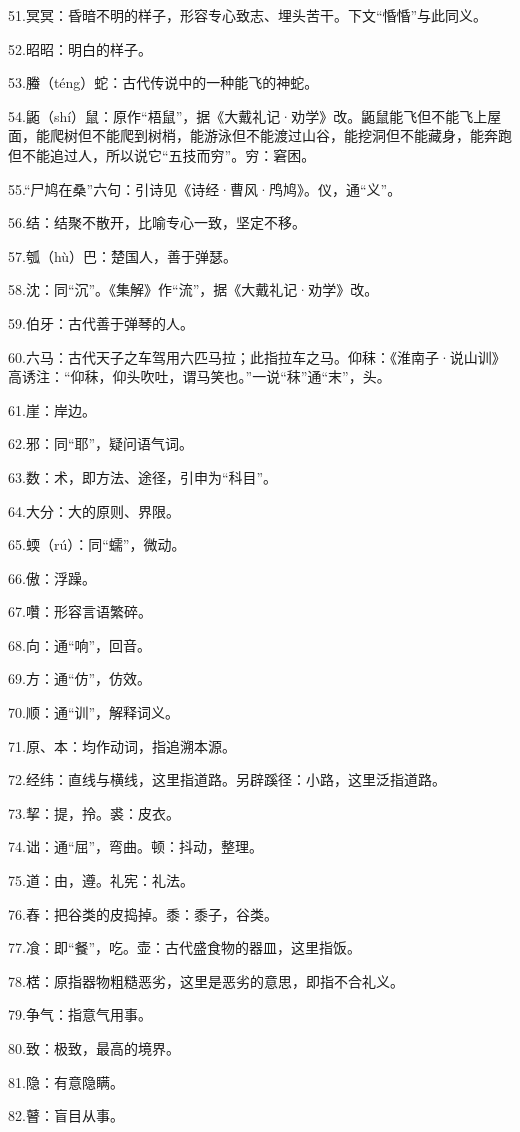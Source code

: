\documentclass[letterpaper,10pt,english]{sphinxmanual}
\begin{document}
51.冥冥：昏暗不明的样子，形容专心致志、埋头苦干。下文“惛惛”与此同义。

52.昭昭：明白的样子。

53.螣（téng）蛇：古代传说中的一种能飞的神蛇。

54.鼫（shí）鼠：原作“梧鼠”，据《大戴礼记·劝学》改。鼫鼠能飞但不能飞上屋面，能爬树但不能爬到树梢，能游泳但不能渡过山谷，能挖洞但不能藏身，能奔跑但不能追过人，所以说它“五技而穷”。穷：窘困。

55.“尸鸠在桑”六句：引诗见《诗经·曹风·鸤鸠》。仪，通“义”。

56.结：结聚不散开，比喻专心一致，坚定不移。

57.瓠（hù）巴：楚国人，善于弹瑟。

58.沈：同“沉”。《集解》作“流”，据《大戴礼记·劝学》改。

59.伯牙：古代善于弹琴的人。

60.六马：古代天子之车驾用六匹马拉；此指拉车之马。仰秣：《淮南子·说山训》高诱注：“仰秣，仰头吹吐，谓马笑也。”一说“秣”通“末”，头。

61.崖：岸边。

62.邪：同“耶”，疑问语气词。

63.数：术，即方法、途径，引申为“科目”。

64.大分：大的原则、界限。

65.蝡（rú）：同“蠕”，微动。

66.傲：浮躁。

67.囋：形容言语繁碎。

68.向：通“响”，回音。

69.方：通“仿”，仿效。

70.顺：通“训”，解释词义。

71.原、本：均作动词，指追溯本源。

72.经纬：直线与横线，这里指道路。另辟蹊径：小路，这里泛指道路。

73.挈：提，拎。裘：皮衣。

74.诎：通“屈”，弯曲。顿：抖动，整理。

75.道：由，遵。礼宪：礼法。

76.舂：把谷类的皮捣掉。黍：黍子，谷类。

77.飡：即“餐”，吃。壶：古代盛食物的器皿，这里指饭。

78.楛：原指器物粗糙恶劣，这里是恶劣的意思，即指不合礼义。

79.争气：指意气用事。

80.致：极致，最高的境界。

81.隐：有意隐瞒。

82.瞽：盲目从事。
\end{document}
